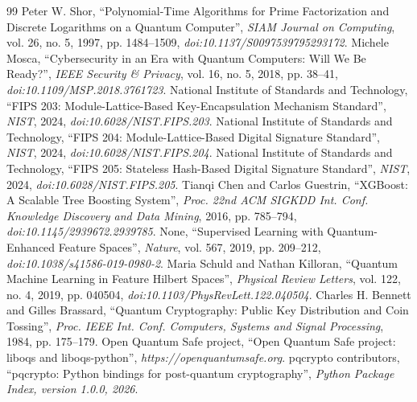 \begin{thebibliography}{99}
 Peter W. Shor, \textquotedblleft{}Polynomial-Time Algorithms for Prime Factorization and Discrete Logarithms on a Quantum Computer\textquotedblright{}, \textit{SIAM Journal on Computing}, vol. 26, no. 5, 1997, pp. 1484--1509, \textit{doi:10.1137/S0097539795293172}.
 Michele Mosca, \textquotedblleft{}Cybersecurity in an Era with Quantum Computers: Will We Be Ready?\textquotedblright{}, \textit{IEEE Security \& Privacy}, vol. 16, no. 5, 2018, pp. 38--41, \textit{doi:10.1109/MSP.2018.3761723}.
 National Institute of Standards and Technology, \textquotedblleft{}FIPS 203: Module-Lattice-Based Key-Encapsulation Mechanism Standard\textquotedblright{}, \textit{NIST}, 2024, \textit{doi:10.6028/NIST.FIPS.203}.
 National Institute of Standards and Technology, \textquotedblleft{}FIPS 204: Module-Lattice-Based Digital Signature Standard\textquotedblright{}, \textit{NIST}, 2024, \textit{doi:10.6028/NIST.FIPS.204}.
 National Institute of Standards and Technology, \textquotedblleft{}FIPS 205: Stateless Hash-Based Digital Signature Standard\textquotedblright{}, \textit{NIST}, 2024, \textit{doi:10.6028/NIST.FIPS.205}.
 Tianqi Chen and Carlos Guestrin, \textquotedblleft{}XGBoost: A Scalable Tree Boosting System\textquotedblright{}, \textit{Proc. 22nd ACM SIGKDD Int. Conf. Knowledge Discovery and Data Mining}, 2016, pp. 785--794, \textit{doi:10.1145/2939672.2939785}.
 None, \textquotedblleft{}Supervised Learning with Quantum-Enhanced Feature Spaces\textquotedblright{}, \textit{Nature}, vol. 567, 2019, pp. 209--212, \textit{doi:10.1038/s41586-019-0980-2}.
 Maria Schuld and Nathan Killoran, \textquotedblleft{}Quantum Machine Learning in Feature Hilbert Spaces\textquotedblright{}, \textit{Physical Review Letters}, vol. 122, no. 4, 2019, pp. 040504, \textit{doi:10.1103/PhysRevLett.122.040504}.
 Charles H. Bennett and Gilles Brassard, \textquotedblleft{}Quantum Cryptography: Public Key Distribution and Coin Tossing\textquotedblright{}, \textit{Proc. IEEE Int. Conf. Computers, Systems and Signal Processing}, 1984, pp. 175--179.
 Open Quantum Safe project, \textquotedblleft{}Open Quantum Safe project: liboqs and liboqs-python\textquotedblright{}, \textit{https://openquantumsafe.org}.
 pqcrypto contributors, \textquotedblleft{}pqcrypto: Python bindings for post-quantum cryptography\textquotedblright{}, \textit{Python Package Index, version 1.0.0, 2026}.

\end{thebibliography}
